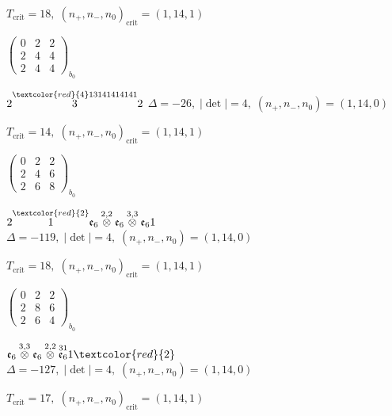 \documentclass[10pt]{article}
\begin{document}
\hspace{1em}$T_{\text{crit}}=18,\; (n_+,n_-,n_0)_{\text{crit}}=(1,14,1)$

\hspace{2em}$\left(\begin{smallmatrix}0 & 2 & 2 \\ 2 & 4 & 4 \\ 2 & 4 & 4\end{smallmatrix}\right)_{\!b_0}$

\smallskip

$2\overset{\textcolor{red}{4}13141414141}{3}2$ \quad $\Delta=-26,\; |\det|=4,\; (n_+,n_-,n_0)=(1,14,0)$

\hspace{1em}$T_{\text{crit}}=14,\; (n_+,n_-,n_0)_{\text{crit}}=(1,14,1)$

\hspace{2em}$\left(\begin{smallmatrix}0 & 2 & 2 \\ 2 & 4 & 6 \\ 2 & 6 & 8\end{smallmatrix}\right)_{\!b_0}$

\smallskip

$2\overset{\textcolor{red}{2}}{1}\mathfrak{e}_6\overset{2,2}{\otimes}\mathfrak{e}_6\overset{3,3}{\otimes}\mathfrak{e}_61$ \quad $\Delta=-119,\; |\det|=4,\; (n_+,n_-,n_0)=(1,14,0)$

\hspace{1em}$T_{\text{crit}}=18,\; (n_+,n_-,n_0)_{\text{crit}}=(1,14,1)$

\hspace{2em}$\left(\begin{smallmatrix}0 & 2 & 2 \\ 2 & 8 & 6 \\ 2 & 6 & 4\end{smallmatrix}\right)_{\!b_0}$

\smallskip

$\mathfrak{e}_6\overset{3,3}{\otimes}\mathfrak{e}_6\overset{2,2}{\otimes}\overset{31}{\mathfrak{e}_6}1\textcolor{red}{2}$ \quad $\Delta=-127,\; |\det|=4,\; (n_+,n_-,n_0)=(1,14,0)$

\hspace{1em}$T_{\text{crit}}=17,\; (n_+,n_-,n_0)_{\text{crit}}=(1,14,1)$
\end{document}
